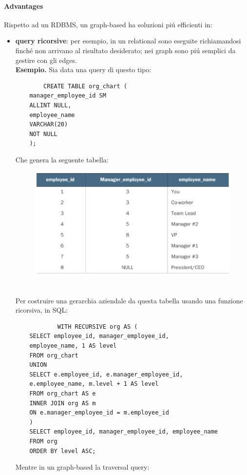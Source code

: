 \paragraph{Advantages} Rispetto ad un RDBMS, un graph-based ha soluzioni piú efficienti in:
\begin{itemize}
    \item \textbf{query ricorsive}: per esempio, in un relational sono eseguite richiamandosi finché non arrivano al risultato desiderato; nei graph sono piú semplici da gestire con gli edges. 
    \\
    \textbf{Esempio.}  Sia data una query di questo tipo:
    \begin{verbatim}
        CREATE TABLE org_chart (
    manager_employee_id SM
    ALLINT NULL,
    employee_name
    VARCHAR(20)
    NOT NULL
    );
    \end{verbatim}
    Che genera la seguente tabella:
    \\
    \begin{figure}[th]
        \centering
        \includegraphics[scale=0.4]{GraphDatabase//img/tabellaesempio.png}
    \end{figure}
    \\
    Per costruire una gerarchia aziendale da questa tabella usando una funzione ricorsiva, in SQL:
    \begin{verbatim}
            WITH RECURSIVE org AS (
    SELECT employee_id, manager_employee_id,
    employee_name, 1 AS level
    FROM org_chart
    UNION
    SELECT e.employee_id, e.manager_employee_id,
    e.employee_name, m.level + 1 AS level
    FROM org_chart AS e
    INNER JOIN org AS m
    ON e.manager_employee_id = m.employee_id
    )
    SELECT employee_id, manager_employee_id, employee_name
    FROM org
    ORDER BY level ASC;
    \end{verbatim}
    Mentre in un graph-based la traversal query:

\end{itemize}
